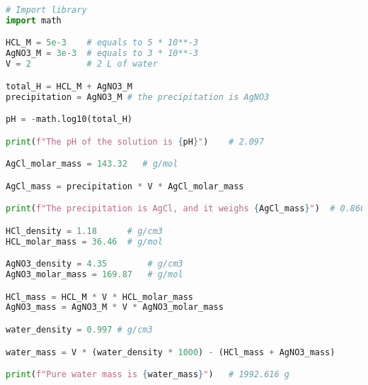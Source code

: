 \documentclass[11pt]{article}
\begin{document}
\begin{lstlisting}[language=Python]
# Import library 
import math

HCL_M = 5e-3    # equals to 5 * 10**-3
AgNO3_M = 3e-3  # equals to 3 * 10**-3
V = 2           # 2 L of water

total_H = HCL_M + AgNO3_M
precipitation = AgNO3_M # the precipitation is AgNO3

pH = -math.log10(total_H)

print(f"The pH of the solution is {pH}")    # 2.097

AgCl_molar_mass = 143.32   # g/mol

AgCl_mass = precipitation * V * AgCl_molar_mass

print(f"The precipitation is AgCl, and it weighs {AgCl_mass}")  # 0.860 g

HCl_density = 1.18      # g/cm3
HCL_molar_mass = 36.46  # g/mol

AgNO3_density = 4.35        # g/cm3
AgNO3_molar_mass = 169.87   # g/mol

HCl_mass = HCL_M * V * HCL_molar_mass
AgNO3_mass = AgNO3_M * V * AgNO3_molar_mass

water_density = 0.997 # g/cm3

water_mass = V * (water_density * 1000) - (HCl_mass + AgNO3_mass)

print(f"Pure water mass is {water_mass}")   # 1992.616 g
    
\end{lstlisting}
\end{document}
